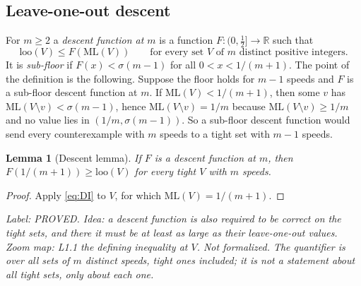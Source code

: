 \documentclass[11pt]{article}
\newtheorem{lemma}[theorem]{Lemma}
\theoremstyle{remark}
\newcommand{\ML}{\mathrm{ML}}
\newcommand{\loo}{\mathrm{loo}}
\newcommand{\R}{\mathbb{R}}
\newcommand{\lab}[1]{\par\smallskip\noindent\textit{Label: #1.}}
\begin{document}
\subsection{Leave-one-out descent}

For $m\ge2$ a \emph{descent function at $m$} is a function $F:(0,\tfrac12]\to\R$ such that
\begin{equation}\label{eq:DI}
\loo(V)\le F(\ML(V))\qquad\text{for every set }V\text{ of }m\text{ distinct positive integers.}
\end{equation}
It is \emph{sub-floor} if $F(x)<\sigma(m-1)$ for all $0<x<1/(m+1)$. The point of the definition is the following. Suppose the floor holds for $m-1$ speeds and $F$ is a sub-floor descent function at $m$. If $\ML(V)<1/(m+1)$, then some $v$ has $\ML(V\setminus v)<\sigma(m-1)$, hence $\ML(V\setminus v)=1/m$ because $\ML(V\setminus v)\ge1/m$ and no value lies in $(1/m,\sigma(m-1))$. So a sub-floor descent function would send every counterexample with $m$ speeds to a tight set with $m-1$ speeds.

\begin{lemma}[Descent lemma]\label{lem:desc}
If $F$ is a descent function at $m$, then $F(1/(m+1))\ge\loo(V)$ for every tight $V$ with $m$ speeds.
\end{lemma}
\begin{proof}
Apply \eqref{eq:DI} to $V$, for which $\ML(V)=1/(m+1)$.
\end{proof}
\lab{PROVED. Idea: a descent function is also required to be correct on the tight sets, and there it must be at least as large as their leave-one-out values. Zoom map: L1.1 the defining inequality at $V$. Not formalized. The quantifier is over all sets of $m$ distinct speeds, tight ones included; it is not a statement about all tight sets, only about each one}
\end{document}
